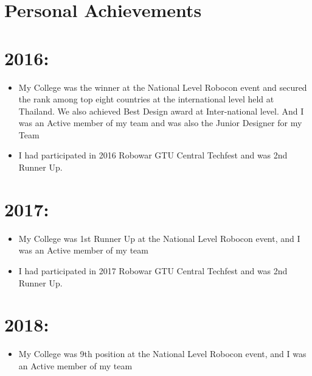 \documentclass[margin,line]{res}
\begin{document}
\begin{resume}
\section{\sc Personal Achievements}
\hspace{.5in}\section{\LARGE2016:}

\begin{itemize}
\item {\sc My College was the winner at the National Level Robocon event and secured the rank among top eight countries at the international level held at Thailand. We also achieved Best Design award at Inter-national level. And I was an Active member of my team and was also the Junior Designer for my Team} \\

\item{\sc I had participated in 2016 Robowar GTU Central Techfest and was 2nd Runner Up.}\\
\end{itemize}

\hspace{.5in}\section{\LARGE2017:}

\begin{itemize}
\item{\sc My College was 1st Runner Up at the National Level Robocon event,  and I was an Active member of my team} \\
	
\item{\sc I had participated in 2017 Robowar GTU Central Techfest and was 2nd Runner Up.}
\end{itemize}

\hspace{.5in}\section{\LARGE2018:}
\begin{itemize}
\item{\sc My College was 9th position at the National Level Robocon event,  and I was an Active member of my team} \\	
\end{itemize}


\end{resume}
\end{document}
